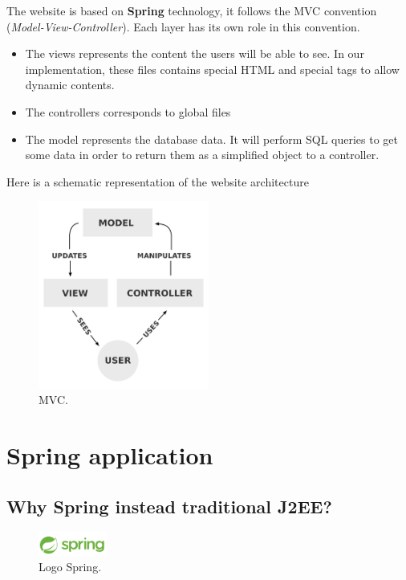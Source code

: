 The website is based on \textbf{Spring} technology,  it follows the MVC convention (\textit{Model-View-Controller}). Each layer has its own role in this convention.


\begin{itemize}  
\item The views represents the content the users will be able to see. In our implementation, these files contains special HTML and special tags to allow dynamic contents. 
\item The controllers corresponds to global files 
\item The model represents the database data. It will perform SQL queries to get some data in order to return them as a simplified object to a controller.
\end{itemize}  

Here is a schematic representation of the website architecture

\begin{figure}[!ht]
  \caption{MVC.}
  \centering
    \includegraphics[width=0.5\textwidth]{img/mvc.png}
\end{figure}

\newpage

\section{Spring application}
\subsection{Why Spring instead traditional J2EE?}

\begin{figure}[H]
  \caption{Logo Spring.}
  \centering
    \includegraphics[width=0.2\textwidth]{img/spring.png}
\end{figure}


